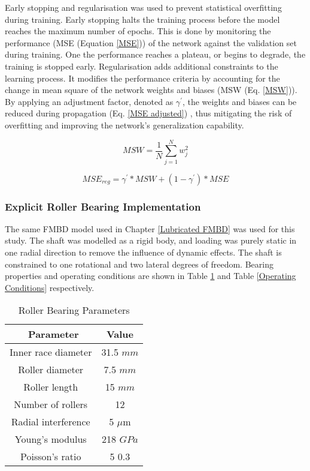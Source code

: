 Early stopping and regularisation was used to prevent statistical overfitting during training. Early stopping halts the training process before the model reaches the maximum number of epochs. This is done by monitoring the performance (MSE (Equation \ref{MSE})) of the network against the validation set during training. One the performance reaches a plateau, or begins to degrade, the training is stopped early. Regularisation adds additional constraints to the learning process. It modifies the performance criteria by accounting for the change in mean square of the network weights and biases (MSW (Eq. \ref{MSW})). By applying an adjustment factor, denoted as $\gamma^{\prime}$, the weights and biases can be reduced during propagation (Eq. \ref{MSE adjusted}) , thus mitigating the risk of overfitting and improving the network's generalization capability.

\begin{equation}\label{MSW}
	M S W=\frac{1}{N} \sum_{j=1}^N w_j^2
\end{equation}

\begin{equation}\label{MSE adjusted}
	M S E_{r e g}=\gamma^{\prime} * M S W+\left(1-\gamma^{\prime}\right) * M S E
\end{equation}

\subsubsection{Explicit Roller Bearing Implementation}
The same FMBD model used in Chapter \ref{Lubricated FMBD} was used for this study. The shaft was modelled as a rigid body, and loading was purely static in one radial direction to remove the influence of dynamic effects. The shaft is constrained to one rotational and two lateral degrees of freedom. Bearing properties and operating conditions are shown in Table \ref{Roller bearing parameters} and Table \ref{Operating Conditions} respectively.

\begin{table*}
	\caption{Roller Bearing Parameters}
	\label{Roller bearing parameters}
	\centering
	\renewcommand{\arraystretch}{1.5}%
	\begin{tabular}{|c|c|}
		\hline
		\ \textbf{Parameter} & \textbf{Value} \\ [0.5ex]
		\hline
		Inner race diameter & 31.5 $mm$ \\ [0.5ex]
		\hline
		Roller diameter & 7.5 $mm$ \\ [0.5ex]
		\hline
		Roller length & 15 $mm$ \\ [0.5ex]
		\hline
		Number of rollers & 12 \\ [0.5ex]
		\hline
		Radial interference & 5 $\mu \mathrm{m}$ \\ [0.5ex]
		\hline
		Young's modulus & 218 $GPa$ \\ [0.5ex]
		\hline
		Poisson's ratio & 5 $0.3$ \\ [0.5ex]
		\hline
	\end{tabular}
\end{table*}

